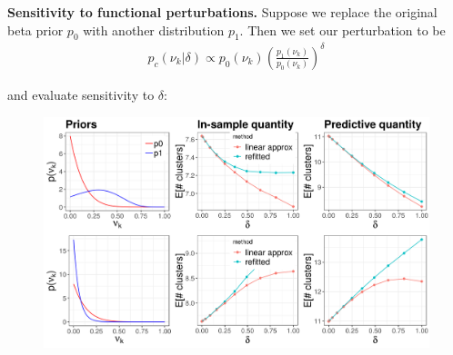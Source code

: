\documentclass[a0,plainsections,30pt]{sciposter}\usepackage[]{graphicx}\usepackage[]{color}
\newenvironment{knitrout}{}{} %
\begin{document}
\begin{minipage}[t]{0.45\textwidth}
{\bf \large Sensitivity to functional perturbations. }
Suppose we replace the original beta prior $p_0$ with another distribution $p_1$. Then we set our perturbation to be
\vspace{-0.3in}
\begin{align*}
p_c(\nu_k \vert \delta) \propto p_{0}(\nu_k)\left(\frac{p_1(\nu_k)}{p_0(\nu_k)}\right)^\delta
\end{align*}
\vspace{-0.3in}

and evaluate sensitivity to $\delta$:
%
\vspace{0.1in}
\begin{figure}
\centering

\begin{knitrout}
\color{fgcolor}

{\centering \includegraphics[width=0.98\linewidth,height=0.588\linewidth]{figure/functional_sens_plot-1} 

}



\end{knitrout}
\end{figure}


\end{minipage}
\end{document}
